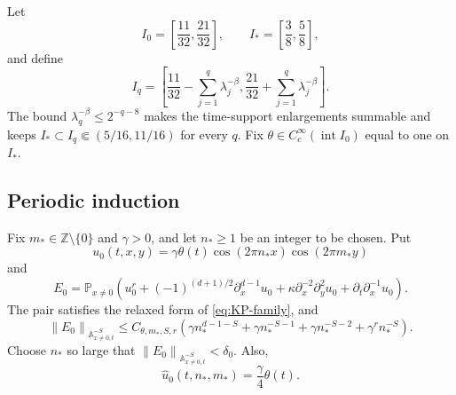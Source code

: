 \documentclass[12pt,reqno,letterpaper]{amsart}
\numberwithin{equation}{section}
\theoremstyle{definition}
\newcommand{\Z}{\mathbb Z}
\newcommand{\A}{\mathbb A}
\newcommand{\la}{\lambda}
\newcommand{\norm}[1]{\left\lVert #1\right\rVert}
\begin{document}
Let
\[
 I_0=\left[\frac{11}{32},\frac{21}{32}\right],
 \qquad I_*=\left[\frac38,\frac58\right],
\]
and define
\[
 I_q=\left[
  \frac{11}{32}-\sum_{j=1}^q\la_j^{-\beta},
  \frac{21}{32}+\sum_{j=1}^q\la_j^{-\beta}
 \right].
\]
The bound $\la_q^{-\beta}\leq2^{-q-8}$ makes the time-support
enlargements summable and keeps
$I_*\subset I_q\Subset(5/16,11/16)$ for every $q$.  Fix
$\theta\in C_c^\infty(\operatorname{int}I_0)$ equal to one on $I_*$.

\subsection{Periodic induction}

Fix $m_*\in\Z\setminus\{0\}$ and $\gamma>0$, and let $n_*\geq1$ be an
integer to be chosen.  Put
\begin{equation*}
 u_0(t,x,y)=\gamma\theta(t)
 \cos(2\pi n_*x)\cos(2\pi m_*y)
\end{equation*}
and
\begin{equation}\label{eq:periodic-induction-initial-pair}
 E_0=\mathbb P_{x\neq0}\left(
 u_0^r+(-1)^{(d+1)/2}\partial_x^{d-1}u_0
 +\kappa\partial_x^{-2}\partial_y^2u_0
 +\partial_t\partial_x^{-1}u_0\right).
\end{equation}
The pair satisfies the relaxed form of \eqref{eq:KP-family}, and
\begin{equation}\label{eq:periodic-induction-initial-error}
 \norm{E_0}_{\A^{-S}_{x\neq0,t}}
 \leq C_{\theta,m_*,S,r}\left(
 \gamma n_*^{d-1-S}+\gamma n_*^{-S-1}
 +\gamma n_*^{-S-2}+\gamma^r n_*^{-S}\right).
\end{equation}
Choose $n_*$ so large that
$\norm{E_0}_{\A^{-S}_{x\neq0,t}}<\delta_0$.  Also,
\begin{equation}\label{eq:periodic-induction-initial-coefficient}
 \widehat u_0(t,n_*,m_*)=\frac\gamma4\theta(t).
\end{equation}
\end{document}
